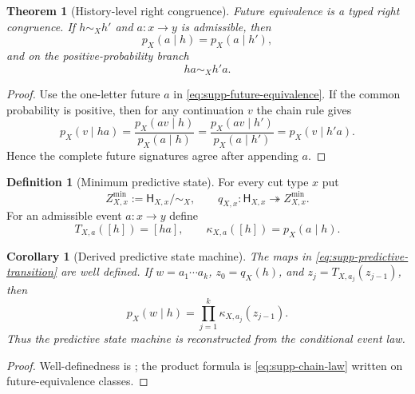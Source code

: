 \documentclass[11pt]{article}
\newtheorem{theorem}{Theorem}[section]
\numberwithin{equation}{section}
\newtheorem{corollary}[corollary]{Corollary}
\theoremstyle{definition}
\newtheorem{definition}[definition]{Definition}
\theoremstyle{remark}
\begin{document}
\begin{theorem}[History-level right congruence]
\label{thm:supp-right-congruence}
Future equivalence is a typed right congruence.  If $h\sim_Xh'$ and
$a:x\to y$ is admissible, then
\begin{equation}
 p_X(a\mid h)=p_X(a\mid h'),
 \label{eq:supp-one-letter-equality}
\end{equation}
and on the positive-probability branch
\begin{equation}
 ha\sim_Xh'a.
 \label{eq:supp-right-congruence}
\end{equation}
\end{theorem}

\begin{proof}
Use the one-letter future $a$ in
\eqref{eq:supp-future-equivalence}.  If the common probability is positive,
then for any continuation $v$ the chain rule gives
\[
 p_X(v\mid ha)
 =\frac{p_X(av\mid h)}{p_X(a\mid h)}
 =\frac{p_X(av\mid h')}{p_X(a\mid h')}
 =p_X(v\mid h'a).
\]
Hence the complete future signatures agree after appending $a$.
\end{proof}

\begin{definition}[Minimum predictive state]
\label{def:supp-predictive-state}
For every cut type $x$ put
\begin{equation}
 Z_{X,x}^{\min}:=\mathsf H_{X,x}/\!\sim_X,
 \qquad
 q_{X,x}:\mathsf H_{X,x}\twoheadrightarrow Z_{X,x}^{\min}.
 \label{eq:supp-predictive-state}
\end{equation}
For an admissible event $a:x\to y$ define
\begin{equation}
 T_{X,a}([h])=[ha],
 \qquad
 \kappa_{X,a}([h])=p_X(a\mid h).
 \label{eq:supp-predictive-transition}
\end{equation}
\end{definition}

\begin{corollary}[Derived predictive state machine]
\label{cor:supp-derived-state-machine}
The maps in \eqref{eq:supp-predictive-transition} are well defined.  If
$w=a_1\cdots a_k$, $z_0=q_X(h)$, and
$z_j=T_{X,a_j}(z_{j-1})$, then
\begin{equation}
 p_X(w\mid h)=\prod_{j=1}^{k}\kappa_{X,a_j}(z_{j-1}).
 \label{eq:supp-state-factorization}
\end{equation}
Thus the predictive state machine is reconstructed from the conditional event
law.
\end{corollary}

\begin{proof}
Well-definedness is ; the product formula is
\eqref{eq:supp-chain-law} written on future-equivalence classes.
\end{proof}
\end{document}
